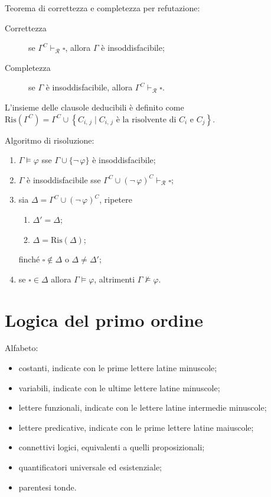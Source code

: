 \documentclass[10pt]{article}
\begin{document}
            Teorema di correttezza e completezza per refutazione:
            \begin{description}
                \item[Correttezza] se \(\Gamma^C \vdash_\mathcal{R} \square\), allora \(\Gamma\) è insoddisfacibile;
                \item[Completezza] se \(\Gamma\) è insoddisfacibile, allora \(\Gamma^C \vdash_\mathcal{R} \square\).
            \end{description}

            L'insieme delle clausole deducibili è definito come \(\mathrm{Ris}\left(\Gamma^C\right) = \Gamma^C \cup \left\{C_{i, \, j} \; | \; C_{i, \, j} \text{ è la risolvente di } C_i \text{ e } C_j\right\}\).

            Algoritmo di risoluzione:
            \begin{enumerate}
                \item \(\Gamma \models \varphi\) sse \(\Gamma \cup \{\neg \, \varphi\}\) è insoddisfacibile;
                \item \(\Gamma\) è insoddisfacibile sse \(\Gamma^C \cup {(\neg \, \varphi)}^C \vdash_\mathcal{R} \square\);
                \item sia \(\Delta = \Gamma^C \cup {(\neg \, \varphi)}^C\), ripetere
                    \begin{enumerate}
                        \item \(\Delta' = \Delta\);
                        \item \(\Delta = \mathrm{Ris}(\Delta)\);
                    \end{enumerate}
                    finché \(\square \notin \Delta\) o \(\Delta \neq \Delta'\);
                \item se \(\square \in \Delta\) allora \(\Gamma \models \varphi\), altrimenti \(\Gamma \not\models \varphi\).
            \end{enumerate}

    \section*{Logica del primo ordine}

        Alfabeto:
        \begin{itemize}
            \item costanti, indicate con le prime lettere latine minuscole;
            \item variabili, indicate con le ultime lettere latine minuscole;
            \item lettere funzionali, indicate con le lettere latine intermedie minuscole;
            \item lettere predicative, indicate con le prime lettere latine maiuscole;
            \item connettivi logici, equivalenti a quelli proposizionali;
            \item quantificatori universale ed esistenziale;
            \item parentesi tonde.
        \end{itemize}
\end{document}
